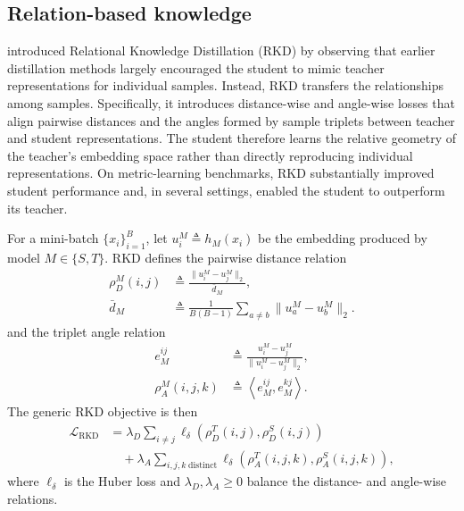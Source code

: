 \documentclass[review,number,sort&compress]{elsarticle}
\theoremstyle{definition}
\begin{document}
\subsection{Relation-based knowledge}
\label{sec:relation-based}

\citet{park2019relational} introduced Relational Knowledge Distillation (RKD) by observing that earlier distillation methods largely encouraged the student to mimic teacher representations for individual samples. Instead, RKD transfers the relationships among samples. Specifically, it introduces distance-wise and angle-wise losses that align pairwise distances and the angles formed by sample triplets between teacher and student representations. The student therefore learns the relative geometry of the teacher's embedding space rather than directly reproducing individual representations. On metric-learning benchmarks, RKD substantially improved student performance and, in several settings, enabled the student to outperform its teacher.

For a mini-batch $\{x_i\}_{i=1}^{B}$, let
$u_i^M\triangleq h_M(x_i)$ be the embedding produced by model
$M\in\{S,T\}$. RKD defines the pairwise distance relation
\begin{equation}
\label{eq:rkd-distance}
\begin{aligned}
\rho_D^M(i,j)
&\triangleq \frac{\lVert u_i^M-u_j^M\rVert_2}{\bar d_M}, \\
\bar d_M
&\triangleq \frac{1}{B(B-1)}
\sum_{a\neq b}\lVert u_a^M-u_b^M\rVert_2.
\end{aligned}
\end{equation}
and the triplet angle relation
\begin{equation}
\label{eq:rkd-angle}
\begin{aligned}
e_M^{ij}
&\triangleq
\frac{u_i^M-u_j^M}{\lVert u_i^M-u_j^M\rVert_2}, \\
\rho_A^M(i,j,k)
&\triangleq \left\langle e_M^{ij},e_M^{kj}\right\rangle .
\end{aligned}
\end{equation}
The generic RKD objective is then
\begin{equation}
\label{eq:rkd-loss}
\begin{aligned}
\mathcal L_{\mathrm{RKD}}
&= \lambda_D\!\sum_{i\neq j}
\ell_\delta\!\left(\rho_D^T(i,j),\rho_D^S(i,j)\right) \\
&\quad + \lambda_A\!\sum_{i,j,k\;\mathrm{distinct}}
\ell_\delta\!\left(\rho_A^T(i,j,k),\rho_A^S(i,j,k)\right),
\end{aligned}
\end{equation}
where $\ell_\delta$ is the Huber loss and $\lambda_D,\lambda_A\geq0$ balance
the distance- and angle-wise relations.
\end{document}
